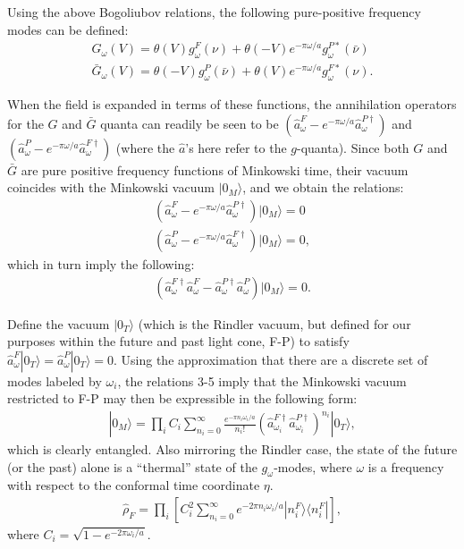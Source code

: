\documentclass[aps,prl,showpacs,12pt]{revtex4}
\begin{document}
Using the above Bogoliubov relations, the following pure-positive frequency modes can be defined:
\begin{eqnarray*}
G_{\omega}(V) = \theta(V)g^{F}_{\omega}(\nu) + \theta(-V) e^{- \pi \omega / a} g^{P \ast}_{\omega}(\bar{\nu}) \\
\bar{G}_{\omega}(V) = \theta(-V)g^{P}_{\omega}(\bar{\nu}) + \theta(V) e^{- \pi \omega / a} g^{F \ast}_{\omega}(\nu).
\end{eqnarray*}

When the field is expanded in terms of these functions, the annihilation operators for the $G$ and $\bar{G}$ quanta can readily be seen to be $(\hat{a}^{F}_{\omega} - e^{- \pi \omega /a} \hat{a}^{P \dagger}_{\omega})$ and $(\hat{a}^{P}_{\omega} - e^{- \pi \omega / a} \hat{a}^{F \dagger}_{\omega} )$ (where the $\hat{a}$'s here refer to the $g$-quanta).  Since both $G$ and $\bar{G}$ are pure positive frequency functions of Minkowski time, their vacuum coincides with the Minkowski vacuum $|0_{M} \rangle$, and we obtain the relations:
\begin{eqnarray}
(\hat{a}^{F}_{\omega} - e^{- \pi \omega /a} \hat{a}^{P \dagger}_{\omega}) |0_{M} \rangle = 0 \\
(\hat{a}^{P}_{\omega} - e^{- \pi \omega / a} \hat{a}^{F \dagger}_{\omega} ) |0_{M} \rangle = 0 ,
\end{eqnarray}
which in turn imply the following:
\begin{eqnarray}
(\hat{a}^{F \dagger}_{\omega} \hat{a}^{F}_{\omega} - \hat{a}^{P \dagger}_{\omega} \hat{a}^{P}_{\omega}) |0_{M} \rangle = 0.
\end{eqnarray}

Define the vacuum $|0_{T} \rangle$ (which is the Rindler vacuum, but defined for our purposes within the future and past light cone, F-P) to satisfy $\hat{a}^{F}_{\omega} |0_{T} \rangle = \hat{a}^{P}_{\omega} |0_{T} \rangle = 0$.  Using the approximation that there are a discrete set of modes labeled by $\omega_{i}$, the relations 3-5 imply that the Minkowski vacuum restricted to F-P may then be expressible in the following form:
\begin{eqnarray}
|0_{M} \rangle = \prod_{i} C_{i} \sum_{n_{i}=0}^{\infty} \frac{e^{- \pi n_{i} \omega_{i} /a}}{n_{i} !}( \hat{a}^{F \dagger}_{\omega_{i}}\hat{a}^{P \dagger}_{\omega_{i}})^{n_{i}} |0_{T} \rangle,
\end{eqnarray}
which is clearly entangled.  Also mirroring the Rindler case, the state of the future (or the past) alone is a ``thermal'' state of the $g_{\omega}$-modes, where $\omega$ is a frequency with respect to the conformal time coordinate $\eta$.
\begin{eqnarray}
\hat{\rho}_{F} = \prod_{i} \left[ C_{i}^{2} \sum_{n_{i} =0}^{\infty} e^{- 2 \pi n_{i} \omega_{i} /a} |n_{i}^{F} \rangle \langle n_{i}^{F} | \right],
\end{eqnarray}
where $C_{i} = \sqrt{1 - e^{-2 \pi \omega_{i} /a}}$.
\end{document}
